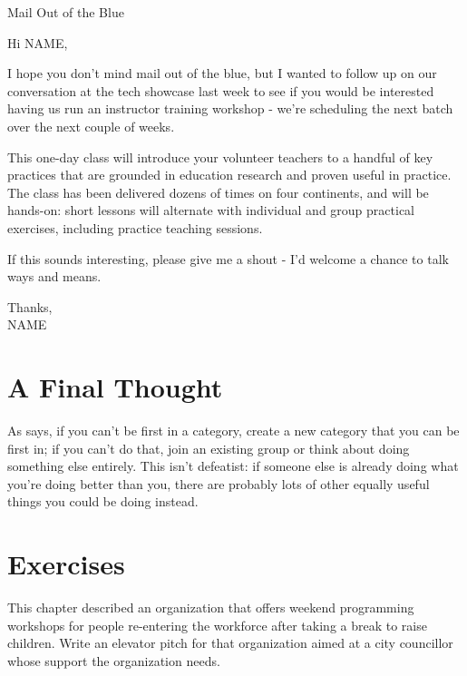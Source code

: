 \begin{callout}{Mail Out of the Blue}

  \noindent
  Hi NAME,

  I hope you don't mind mail out of the blue, but I wanted to follow
  up on our conversation at the tech showcase last week to see if you
  would be interested having us run an instructor training workshop -
  we're scheduling the next batch over the next couple of weeks.

  \newpage %

  This one-day class will introduce your volunteer teachers to a
  handful of key practices that are grounded in education research and
  proven useful in practice. The class has been delivered dozens of
  times on four continents, and will be hands-on: short lessons will
  alternate with individual and group practical exercises, including
  practice teaching sessions.

  If this sounds interesting, please give me a shout - I'd welcome a
  chance to talk ways and means.

  \noindent
  Thanks,\\
  NAME

\end{callout}

\section{A Final Thought}\label{s:marketing-final}

As \cite{Kuch2011} says, if you can't be first in a category, create a
new category that you can be first in; if you can't do that, join an
existing group or think about doing something else entirely. This
isn't defeatist: if someone else is already doing what you're doing
better than you, there are probably lots of other equally useful
things you could be doing instead.

\section{Exercises}\label{s:marketing-exercises}


This chapter described an organization that offers weekend programming
workshops for people re-entering the workforce after taking a break to
raise children. Write an elevator pitch for that organization aimed at
a city councillor whose support the organization needs.

